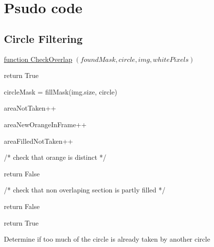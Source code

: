 \documentclass[conference]{IEEEtran}
\begin{document}
\section{Psudo code}

\subsection{Circle Filtering}


\begin{algorithm} 

    \underline{function CheckOverlap} $(foundMask, circle, img, whitePixels)$\;
    
    {
    	return True
    }
        
    circleMask = fillMask(img.size, circle)
    
    {
	 {
		{
			areaNotTaken++
		}
		
		{
			areaNewOrangeInFrame++
		}
		
		{
			areaFilledNotTaken++
		}
	 }
    }
    
    /* check that orange is distinct */
    
     {
	return False
    }
    
    /* check that non overlaping section is partly filled */
    
     {
	return False
    }
    
    return True
    
    \caption{Determine if too much of the circle is already taken by another circle} \label{CheckOverlapAlg}
\end{algorithm}
\end{document}
